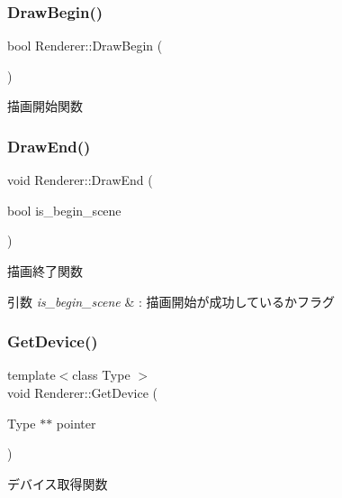 \subsubsection{\texorpdfstring{Draw\+Begin()}{DrawBegin()}}
{\footnotesize\ttfamily bool Renderer\+::\+Draw\+Begin (\begin{DoxyParamCaption}{ }\end{DoxyParamCaption})}



描画開始関数 

\mbox{\label{class_renderer_a0393849bd4178a33861780bf07b0deee}} 
\subsubsection{\texorpdfstring{Draw\+End()}{DrawEnd()}}
{\footnotesize\ttfamily void Renderer\+::\+Draw\+End (\begin{DoxyParamCaption}\item[{bool}]{is\+\_\+begin\+\_\+scene }\end{DoxyParamCaption})}



描画終了関数 


\begin{DoxyParams}{引数}
{\em is\+\_\+begin\+\_\+scene} & \+: 描画開始が成功しているかフラグ \\
\hline
\end{DoxyParams}
\mbox{\label{class_renderer_a6610c3a85a8170141c4584cecf4a6d15}} 
\subsubsection{\texorpdfstring{Get\+Device()}{GetDevice()}}
{\footnotesize\ttfamily template$<$class Type $>$ \\
void Renderer\+::\+Get\+Device (\begin{DoxyParamCaption}\item[{Type $\ast$$\ast$}]{pointer }\end{DoxyParamCaption})\hspace{0.3cm}{\ttfamily [inline]}}



デバイス取得関数 

